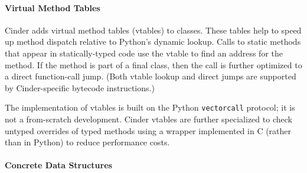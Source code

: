 \documentclass[english,cleveref,crc]{programming}
\newcommand{\code}[1]{\texttt{#1}}
\begin{document}
\paragraph{Virtual Method Tables}
\label{s:vtable}


Cinder adds virtual method tables (vtables) to classes.
These tables help to speed up method dispatch relative to Python's
dynamic lookup.
Calls to static methods that appear in statically-typed
code use the vtable to find an address for the method.
If the method is part of a final class, then the call is further optimized
to a direct function-call jump.
(Both vtable lookup and direct jumps are supported by Cinder-specific bytecode
instructions.)

The implementation of vtables is built on the Python \code{vectorcall}
protocol; it is not a from-scratch development.
Cinder vtables are further specialized to check untyped overrides of typed methods
using a wrapper implemented in C (rather than in Python) to reduce performance costs.



\paragraph{Concrete Data Structures}
\label{s:chkdict-impl}
\end{document}
